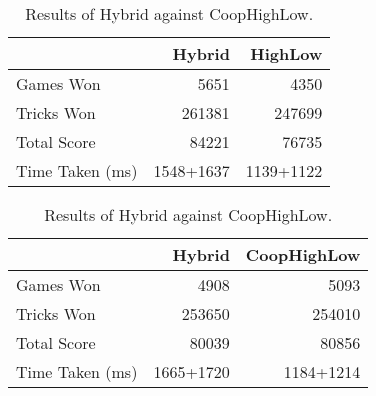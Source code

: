 \begin{table}[ht]
    \begin{minipage}{.5\linewidth}
        \centering
        \begin{tabular}{l|rr}
            ~               &  Hybrid &   HighLow  \\  \hline
            Games Won       &   5651        &   4350   \\
            Tricks Won      &   261381      &   247699 \\
            Total Score     &   84221      &   76735  \\
            Time Taken (ms) &   1548+1637   &   1139+1122
        \end{tabular}
        \caption{Results of Hybrid against ~~ HighLow.}
        \label{tab:hybrid_highlow}
    \end{minipage}%
    \begin{minipage}{.5\linewidth}
        \centering
        \begin{tabular}{l|rr}
            ~               &  Hybrid &   CoopHighLow  \\  \hline
            Games Won       &   4908        &   5093   \\
            Tricks Won      &   253650      &   254010 \\
            Total Score     &   80039      &   80856  \\
            Time Taken (ms) &   1665+1720   &   1184+1214
        \end{tabular}
        \caption{Results of Hybrid against CoopHighLow.}
        \label{tab:hybrid_coophighlow}
    \end{minipage} 
\end{table}


